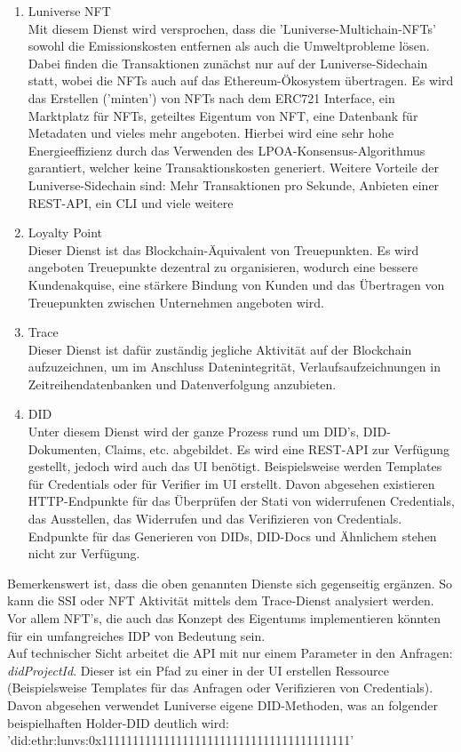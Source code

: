 \begin{enumerate}
	\item Luniverse NFT \\
	Mit diesem Dienst wird versprochen, dass die 'Luniverse-Multichain-NFTs' sowohl die Emissionskosten entfernen als auch die Umweltprobleme lösen. Dabei finden die Transaktionen zunächst nur auf der Luniverse-Sidechain statt, wobei die NFTs auch auf das Ethereum-Ökosystem übertragen. Es wird das Erstellen ('minten') von NFTs nach dem ERC721 Interface, ein Marktplatz für NFTs, geteiltes Eigentum von NFT, eine Datenbank für Metadaten und vieles mehr angeboten. Hierbei wird eine sehr hohe Energieeffizienz durch das Verwenden des LPOA-Konsensus-Algorithmus garantiert, welcher keine Transaktionskosten generiert.
	Weitere Vorteile der Luniverse-Sidechain sind: Mehr Transaktionen pro Sekunde, Anbieten einer REST-API, ein CLI und viele weitere
	
	\item Loyalty Point \\
	Dieser Dienst ist das Blockchain-Äquivalent von Treuepunkten. Es wird angeboten Treuepunkte dezentral zu organisieren, wodurch eine bessere Kundenakquise, eine stärkere Bindung von Kunden und das Übertragen von Treuepunkten zwischen Unternehmen angeboten wird.
	
	\item Trace \\
	Dieser Dienst ist dafür zuständig jegliche Aktivität auf der Blockchain aufzuzeichnen, um im Anschluss Datenintegrität, Verlaufsaufzeichnungen in Zeitreihendatenbanken und Datenverfolgung anzubieten.
	
	
	\item DID \\
	Unter diesem Dienst wird der ganze Prozess rund um DID's, DID-Dokumenten, Claims, etc. abgebildet. Es wird eine REST-API zur Verfügung gestellt, jedoch wird auch das UI benötigt. Beispielsweise werden Templates für Credentials oder für Verifier im UI erstellt.
	Davon abgesehen existieren HTTP-Endpunkte für das Überprüfen der Stati von widerrufenen Credentials, das Ausstellen, das Widerrufen und das Verifizieren von Credentials. Endpunkte für das Generieren von DIDs, DID-Docs und Ähnlichem stehen nicht zur Verfügung.
	
\end{enumerate}

Bemerkenswert ist, dass die oben genannten Dienste sich gegenseitig ergänzen. So kann die SSI oder NFT Aktivität mittels dem Trace-Dienst analysiert werden. Vor allem NFT's, die auch das Konzept des Eigentums implementieren könnten für ein umfangreiches IDP von Bedeutung sein. \\
Auf technischer Sicht arbeitet die API mit nur einem Parameter in den Anfragen: \textsl{didProjectId}. Dieser ist ein Pfad zu einer in der UI erstellen Ressource (Beispielsweise Templates für das Anfragen oder Verifizieren von Credentials). Davon abgesehen verwendet Luniverse eigene DID-Methoden, was an folgender beispielhaften Holder-DID deutlich wird: 'did:ethr:lunvs:0x1111111111111111111111111111111111111111' 

